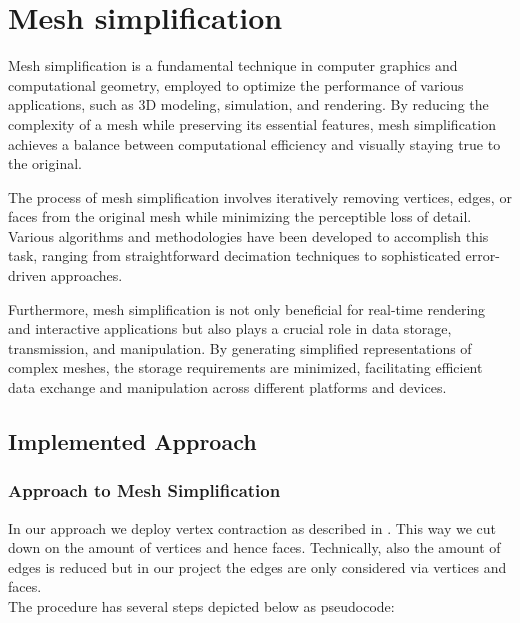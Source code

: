 \section{Mesh simplification}
Mesh simplification is a fundamental technique in computer graphics and computational geometry, employed to optimize the performance of various applications, such as 3D modeling, simulation, and rendering. By reducing the complexity of a mesh while preserving its essential features, mesh simplification achieves a balance between computational efficiency and visually staying true to the original.

The process of mesh simplification involves iteratively removing vertices, edges, or faces from the original mesh while minimizing the perceptible loss of detail. Various algorithms and methodologies have been developed to accomplish this task, ranging from straightforward decimation techniques to sophisticated error-driven approaches.

Furthermore, mesh simplification is not only beneficial for real-time rendering and interactive applications but also plays a crucial role in data storage, transmission, and manipulation. By generating simplified representations of complex meshes, the storage requirements are minimized, facilitating efficient data exchange and manipulation across different platforms and devices.

\subsection{Implemented Approach}
\subsubsection{Approach to Mesh Simplification}
In our approach we deploy vertex contraction as described in \cite{GarlandHeckbert}. This way we cut down on the amount of vertices and hence faces. Technically, also the amount of edges is reduced but in our project the edges are only considered via vertices and faces.\\
The procedure has several steps depicted below as pseudocode:

